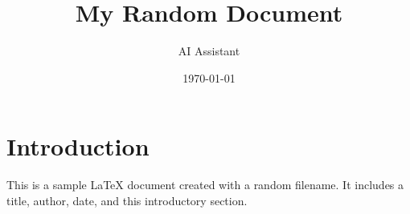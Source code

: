 \documentclass{article}
\title{My Random Document}
\author{AI Assistant}
\date{\today}
\begin{document}
\maketitle

\section{Introduction}
This is a sample LaTeX document created with a random filename. It includes a title, author, date, and this introductory section.
\end{document}
